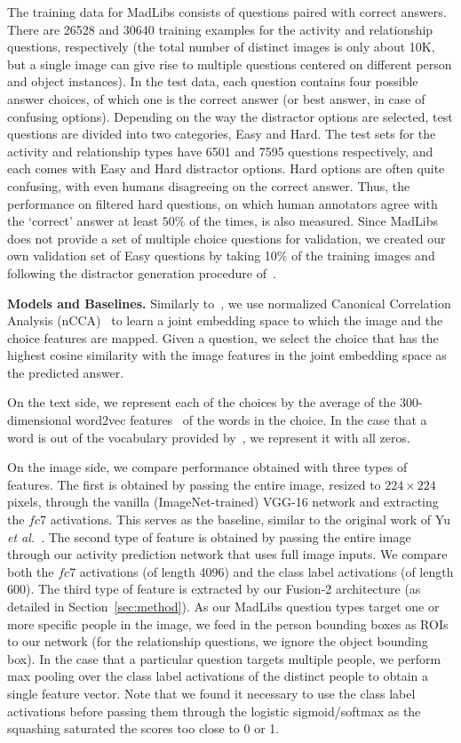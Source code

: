 \documentclass[runningheads]{llncs}
\begin{document}
The training data for MadLibs consists of questions paired with correct answers. 
There are 26528 and 30640 training examples for the activity and relationship questions, respectively (the total number of distinct images is only about 10K, but a single image can give rise to multiple questions centered on different person and object instances). In the test data, each question contains four possible answer choices, of which one is the correct answer (or best answer, in case of confusing options). Depending on the way the distractor options are selected, test questions are divided into two categories, Easy and Hard. The test sets for the activity and relationship types have 6501 and 7595 questions respectively, and each comes with Easy and Hard distractor options. Hard options are often quite confusing, with even humans disagreeing on the correct answer. Thus, the performance on filtered hard questions, on which human annotators agree with the `correct' answer at least $50\%$ of the times, is also measured. Since MadLibs does not provide a set of multiple choice questions for validation, we created our own validation set of Easy questions by taking 10\% of the training images and following the distractor generation procedure of~\cite{yu2015visual}.

{\bf Models and Baselines.}
Similarly to~\cite{yu2015visual}, we use normalized Canonical Correlation Analysis (nCCA)~\cite{gong2014multi} to learn a joint embedding space to which the image and the choice features are mapped. Given a question, we select the choice that has the highest cosine similarity with the image features in the joint embedding space as the predicted answer.

On the text side, we represent each of the choices by the average of the 300-dimensional word2vec features~\cite{mikolov2013distributed} of the words in the choice. In the case that a word is out of the vocabulary provided by~\cite{word2vec}, we represent it with all zeros. 

On the image side, we compare performance obtained with three types of features. The first is obtained by passing the entire image, resized to $224\times 224$ pixels, through the vanilla (ImageNet-trained) VGG-16 network and extracting the $fc7$ activations. This serves as the baseline, similar to the original work of Yu \emph{et al.}~\cite{yu2015visual}. The second type of feature is obtained by passing the entire image through our activity prediction network that uses full image inputs. We compare both the $fc7$ activations (of length 4096) and the class label activations (of length 600). The third type of feature is extracted by our Fusion-2 architecture (as detailed in Section~\ref{sec:method}). As our MadLibs question types target one or more specific people in the image, we feed in the person bounding boxes as ROIs to our network (for the relationship questions, we ignore the object bounding box). In the case that a particular question targets multiple people, we perform max pooling over the class label activations of the distinct people to obtain a single feature vector. Note that we found it necessary to use the class label activations before passing them through the logistic sigmoid/softmax as the squashing saturated the scores too close to 0 or 1. 
\end{document}
